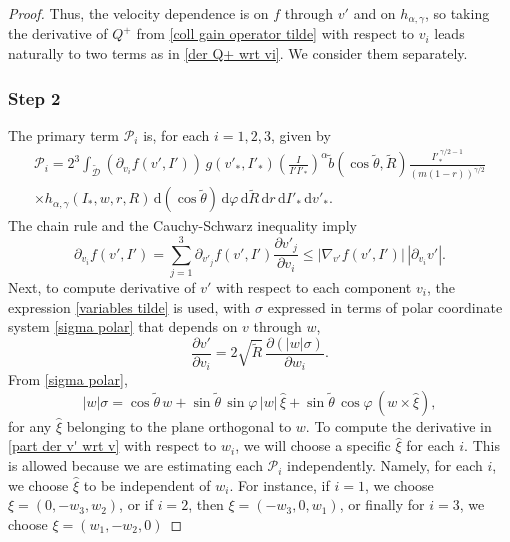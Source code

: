 \documentclass[11pt,a4paper]{amsart}
\newcommand{\md}{\mathrm{d}}
\newcommand{\g}{\gamma}
\newcommand{\Dt}{\tilde{\mathcal{D}}}
\newcommand{\hag}{h_{\alpha,\g}}
\newcommand{\Prim}{\mathcal{P}}
\begin{document}
\begin{proof}
Thus, the velocity dependence is on $f$ through $v'$ and  on $	\hag$, so taking the derivative of $Q^+$ from \eqref{coll gain operator tilde} with respect to $v_i$ leads naturally to two terms as in \eqref{der Q+ wrt vi}. We consider them separately. 


\subsubsection*{Step 2}  The primary term $\Prim_i$ is, for each $i=1,2,3$, given by
	\begin{multline}\label{coll gain operator tilde 1}
\Prim_i = 2^3 \int_{	\Dt} \left( \partial_{v_i}  f(v',I') \right) \, g(v'_*,I'_*) \left(\frac{I }{I' I'_* }\right)^{\alpha}  \tilde{b}(\cos\tilde{\theta},\tilde{R})    \frac{I'^{\,\g/2-1}_*}{(m(1-r))^{\g/2}} \\ \times 	\hag(I_*, w, r, R) \, 	\md (\cos\tilde{\theta}) \, \md \varphi \, \md \tilde{R} \, \md r \, \md I'_* \, \md v'_*.
\end{multline}
The chain rule and the Cauchy-Schwarz inequality imply
\begin{equation}\label{part f}
 \partial_{v_i}  f(v',I')  = \sum_{j=1}^3  \partial_{v'_j}  f(v',I')  \frac{\partial v'_j}{\partial v_i}  \leq \left| \nabla_{v'} f(v',I') \right| \, \left| \partial_{v_i} v' \right|.  
\end{equation}
Next, to compute derivative of $v'$ with respect to each component  $v_i$, the expression \eqref{variables tilde} is used, with   $\sigma$  expressed in terms of polar coordinate system \eqref{sigma polar} that depends on $v$ through $w$,
\begin{equation}\label{part der v' wrt v}
\frac{\partial v'}{\partial v_i} = 2 \sqrt{\tilde{R}} \, \frac{\partial( 	|w|	\sigma )}{\partial w_i}.
\end{equation}
From \eqref{sigma polar},
\begin{equation}\label{w s j}
|w|	\sigma = \cos \tilde{\theta} \,  {w} + \sin\tilde{\theta} \, \sin\varphi \, |w| \, \hat{\xi} +  \sin\tilde{\theta} \, \cos\varphi \,\left( w \times  \hat{\xi} \right),
\end{equation}
for any $\hat{\xi}$ belonging to the plane orthogonal to $w$. To compute the derivative in \eqref{part der v' wrt v} with respect to $w_i$, we will choose a  specific $\hat{\xi}$ for each $i$. This is allowed because we are estimating each $\Prim_i$ independently.  Namely,  for each $i$, we choose $\hat{\xi}$ to be independent of $w_i$. For instance, if $i=1$, we choose $ \xi= (0,-w_3,w_2)$, or if  $i=2$, then $ \xi = (-w_3, 0, w_1)$, or finally for $i=3$, we choose $\xi=(w_1,-w_2,0)$

\end{proof}
\end{document}
